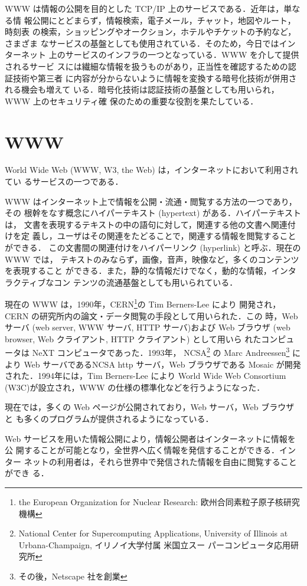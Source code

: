 WWW は情報の公開を目的とした TCP/IP 上のサービスである．近年は，単なる情
報公開にとどまらず，情報検索，電子メール，チャット，地図やルート，時刻表
の検索，ショッピングやオークション，ホテルやチケットの予約など，さまざま
なサービスの基盤としても使用されている．そのため，今日ではインターネット
上のサービスのインフラの一つとなっている．WWW を介して提供されるサービ
スには繊細な情報を扱うものがあり，正当性を確認するための認証技術や第三者
に内容が分からないように情報を変換する暗号化技術が併用される機会も増えて
いる．暗号化技術は認証技術の基盤としても用いられ，WWW 上のセキュリティ確
保のための重要な役割を果たしている．

\section{WWW}
World Wide Web (WWW, W3, the Web) は，インターネットにおいて利用されてい
るサービスの一つである．

WWW はインターネット上で情報を公開・流通・閲覧する方法の一つであり，その
根幹をなす概念にハイパーテキスト (hypertext) がある．ハイパーテキストは，
文書を表現するテキストの中の語句に対して，関連する他の文書へ関連付けを定
義し，ユーザはその関連をたどることで，関連する情報を閲覧することができる．
この文書間の関連付けをハイパーリンク (hyperlink) と呼ぶ．現在の WWW では，
テキストのみならず，画像，音声，映像など，多くのコンテンツを表現すること
ができる．また，静的な情報だけでなく，動的な情報，インタラクティブなコン
テンツの流通基盤としても用いられている．

現在の WWW は，1990年，CERN\footnote{the European Organization for
Nuclear Research: 欧州合同素粒子原子核研究機構}の Tim Berners-Lee により
開発され，CERN の研究所内の論文・データ閲覧の手段として用いられた．この
時，Web サーバ (web server, WWW サーバ, HTTP サーバ)および Web ブラウザ
(web browser, Web クライアント, HTTP クライアント) として用いら
れたコンピュータは NeXT コンピュータであった．1993年，
NCSA\footnote{National Center for Supercomputing Applications,
University of Illinois at Urbana-Champaign, イリノイ大学付属 米国立スー
パーコンピュータ応用研究所} の Marc Andreessen\footnote{その後，Netscape 
社を創業} により Web サーバであるNCSA http サーバ，Web ブラウザである 
Mosaic が開発された．1994年には，Tim Berners-Lee により World Wide Web
Consortium (W3C)が設立され，WWW の仕様の標準化などを行うようになった．

現在では，多くの Web ページが公開されており，Web サーバ，Web ブラウザと
も多くのプログラムが提供されるようになっている．

Web サービスを用いた情報公開により，情報公開者はインターネットに情報を公
開することが可能となり，全世界へ広く情報を発信することができる．インター
ネットの利用者は，それら世界中で発信された情報を自由に閲覧することができ
る．


